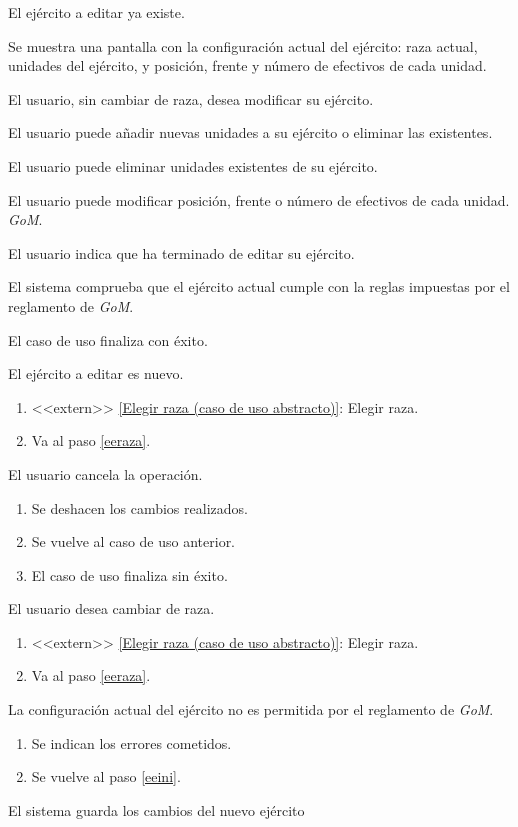 {
  \item El ejército a editar ya existe. \label{eeexiste}
  \item Se muestra una pantalla con la configuración actual del ejército: raza actual, unidades del ejército, y posición, frente y número de efectivos de cada unidad.
  \item El usuario, sin cambiar de raza, desea modificar su ejército. \label{eeraza}
  \item El usuario puede añadir nuevas unidades a su ejército o eliminar las existentes. \label{eeini}
  \item El usuario puede eliminar unidades existentes de su ejército.
  \item El usuario puede modificar posición, frente o número de efectivos de cada unidad. \textit{GoM}. \label{eemoduni}
  \item El usuario indica que ha terminado de editar su ejército. \label{eefin}
  \item El sistema comprueba que el ejército actual cumple con la reglas impuestas por el reglamento de \textit{GoM}. \label{eereglas}
  \item El caso de uso finaliza con éxito.
}
{
  \item[\ref{eeexiste}:] El ejército a editar es nuevo.
    \begin{enumerate}
    \item <<extern>> \ref{Elegir raza (caso de uso abstracto)}: Elegir raza.
    \item Va al paso \ref{eeraza}.
    \end{enumerate}
  \item[\ref{eeraza}-\ref{eefin}:] El usuario cancela la operación.
    \begin{enumerate}
    \item Se deshacen los cambios realizados.
    \item Se vuelve al caso de uso anterior.
    \item El caso de uso finaliza sin éxito.
    \end{enumerate}
  \item[\ref{eeini}-\ref{eemoduni}:] El usuario desea cambiar de raza.
    \begin{enumerate}
    \item <<extern>> \ref{Elegir raza (caso de uso abstracto)}: Elegir raza.
    \item Va al paso \ref{eeraza}.
    \end{enumerate}
  \item[\ref{eereglas}:] La configuración actual del ejército no es permitida por el reglamento de \textit{GoM}.
    \begin{enumerate}
    \item Se indican los errores cometidos.
    \item Se vuelve al paso \ref{eeini}.
    \end{enumerate}
}{El sistema guarda los cambios del nuevo ejército}